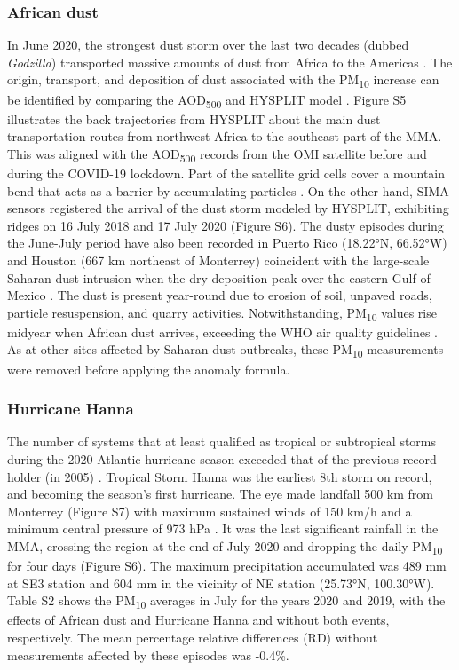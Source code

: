 \documentclass[preprint,12pt]{elsarticle}
\begin{document}
\subsubsection{African dust}
In June 2020, the strongest dust storm over the last two decades (dubbed \textit{Godzilla}) transported massive amounts of dust from Africa to the Americas \citep{Francis_2020}. The origin, transport, and deposition of dust associated with the PM\textsubscript{10} increase can be identified by comparing the AOD\textsubscript{500} and HYSPLIT model \citep{Yassin_2018}. Figure S5 illustrates the back trajectories from HYSPLIT about the main dust transportation routes from northwest Africa to the southeast part of the MMA. This was aligned with the AOD\textsubscript{500} records from the OMI satellite before and during the COVID-19 lockdown. Part of the satellite grid cells cover a mountain bend that acts as a barrier by accumulating particles \citep{Gonz_lez_Santiago_2011,Martinez_2012}. On the other hand, SIMA sensors registered the arrival of the dust storm modeled by HYSPLIT, exhibiting ridges on 16 July 2018 and 17 July 2020 (Figure S6). The dusty episodes during the June-July period have also been recorded in Puerto Rico (18.22°N, 66.52°W) \citep{Euphrasie_Clotilde_2020} and Houston (667 km northeast of Monterrey) coincident with the large-scale Saharan dust intrusion \citep{Bozlaker_2013} when the dry deposition peak over the eastern Gulf of Mexico \citep{Lenes_2012}. The dust is present year-round due to erosion of soil, unpaved roads, particle resuspension, and quarry activities. Notwithstanding, PM\textsubscript{10} values rise midyear when African dust arrives, exceeding the WHO air quality guidelines \citep{Prospero_2014}. As at other sites affected by Saharan dust outbreaks, these PM\textsubscript{10} measurements were removed \citep{Clemente_2022} before applying the anomaly formula.
\subsubsection{Hurricane Hanna}
The number of systems that at least qualified as tropical or subtropical storms during the 2020 Atlantic hurricane season exceeded that of the previous record-holder (in 2005) \citep{stefano2021,Beven_2021}. Tropical Storm Hanna was the earliest 8th storm on record, and becoming the season's first hurricane. The eye made landfall 500 km from Monterrey (Figure S7) with maximum sustained winds of 150 km/h and a minimum central pressure of 973 hPa \citep{conagua}. It was the last significant rainfall in the MMA, crossing the region at the end of July 2020 and dropping the daily PM\textsubscript{10} for four days (Figure S6). The maximum precipitation accumulated was 489 mm at SE3 station and 604 mm in the vicinity of NE station (25.73°N, 100.30°W). Table S2 shows the PM\textsubscript{10} averages in July for the years 2020 and 2019, with the effects of African dust and Hurricane Hanna and without both events, respectively. The mean percentage relative differences (RD) without measurements affected by these episodes was -0.4\%.
\end{document}
